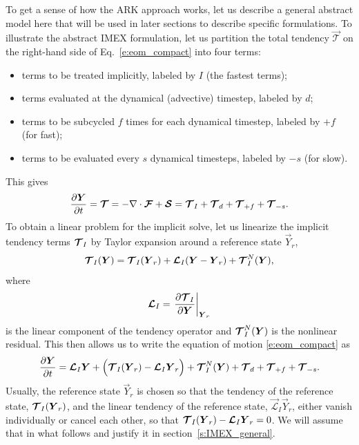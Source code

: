 \documentclass{report}
\begin{document}
To get a sense of how the ARK approach works, let us describe a general abstract model here that will be used in later sections to describe specific formulations. To illustrate the abstract IMEX formulation, let us partition the total tendency $\vec{\mathcal{T}}$ on the right-hand side of Eq.~\eqref{e:eom_compact} into four terms: 
\begin{itemize}
    \item terms to be treated implicitly, labeled by $I$ (the fastest terms);
    \item terms evaluated at the dynamical (advective) timestep, labeled by $d$;
    \item terms to be subcycled $f$ times for each dynamical timestep, labeled by $+f$ (for fast);
    \item terms to be evaluated every $s$ dynamical timesteps, labeled by $-s$ (for slow).
\end{itemize}
This gives
\[
\frac{\partial \boldsymbol{{Y}}}{\partial t} = \boldsymbol{{\mathcal{T}}} = - \nabla \cdot \boldsymbol{{\mathcal{F}}} + \boldsymbol{{\mathcal{S}}} = \boldsymbol{{\mathcal{T}}}_{I} + \boldsymbol{{\mathcal{T}}}_{d} + \boldsymbol{{\mathcal{T}}}_{+f} + \boldsymbol{{\mathcal{T}}}_{-s}.
\]
To obtain a linear problem for the implicit solve, let us linearize the implicit tendency terms $\boldsymbol{{\mathcal{T}}}_{I}$ by Taylor expansion around a reference state $\vec{Y}_r$,
\begin{equation}\label{e:imex_linearization}
\boldsymbol{{\mathcal{T}}}_{I}(\boldsymbol{{Y}}) =  \boldsymbol{{\mathcal{T}}}_I(\boldsymbol{{Y}}_r) + \boldsymbol{{\mathcal{L}}}_I (\boldsymbol{{Y}} - \boldsymbol{{Y}}_r) + \boldsymbol{{\mathcal{T}}}^N_{I}(\boldsymbol{{Y}}),
\end{equation}
where 
\begin{equation}
    \boldsymbol{{\mathcal{L}}}_I = \left. \frac{\partial\boldsymbol{{\mathcal{T}}}_I}{\partial\boldsymbol{{Y}}}\right|_{\boldsymbol{{Y}}_r}
\end{equation} 
is the linear component of the tendency operator and $\boldsymbol{{\mathcal{T}}}^N_{I}(\boldsymbol{{Y}})$ is the nonlinear residual. This then allows us to write the equation of motion \eqref{e:eom_compact} as
\begin{equation}
\label{eq:IMEX}
\frac{\partial\boldsymbol{{Y}}}{\partial t} =  \boldsymbol{{\mathcal{L}}}_I \boldsymbol{{Y}} + \Bigl(\boldsymbol{{\mathcal{T}}}_I(\boldsymbol{{Y}}_r) - \boldsymbol{{\mathcal{L}}}_I \boldsymbol{{Y}}_r\Bigr) + \boldsymbol{{\mathcal{T}}}^N_{I}(\boldsymbol{{Y}}) + \boldsymbol{{\mathcal{T}}}_{d} + \boldsymbol{{\mathcal{T}}}_{+f} + \boldsymbol{{\mathcal{T}}}_{-s}.
\end{equation}
Usually, the reference state $\vec{Y}_r$ is chosen so that the tendency of the reference state, $\boldsymbol{{\mathcal{T}}}_I(\boldsymbol{{Y}}_r)$, and the linear tendency of the reference state, $\vec{\mathcal{L}}_I \vec{Y}_r$, either vanish individually or cancel each other, so that $\boldsymbol{{\mathcal{T}}}_I(\boldsymbol{{Y}}_r) - \boldsymbol{{\mathcal{L}}}_I \boldsymbol{{Y}}_r=0$. We will assume that in what follows and justify it in section~\ref{s:IMEX_general}.
\end{document}
